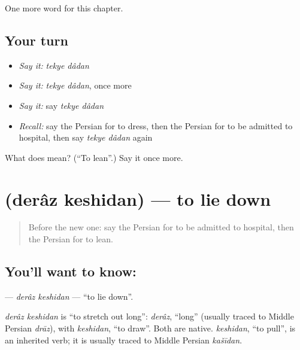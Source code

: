\begin{grammarlens}[title={What you've built}]
One more word for this chapter.
\end{grammarlens}

\subsection*{Your turn}
\begin{itemize}
\raggedright
  \item \emph{Say it:} \emph{tekye dâdan}
  \item \emph{Say it:} \emph{tekye dâdan}, once more
  \item \emph{Say it:} say \emph{tekye dâdan}
  \item \emph{Recall:} say the Persian for to dress, then the Persian for to be admitted to hospital, then say \emph{tekye dâdan} again
\end{itemize}

\begin{tcolorbox}[breakable,colback=teal!4,colframe=teal!35!black,title={Before you move on}]
What does   mean? (\textquotedblleft{}To lean\textquotedblright{}.) Say it once more.
\end{tcolorbox}
\section[\texorpdfstring{\fa{دراز} \fa{کشیدن} (derâz keshidan)}{دراز کشیدن (derâz keshidan)}]{  (derâz keshidan) — to lie down}

\label{lesson:FA-C261-deraz-keshidan}



\begin{quote}
Before the new one: say the Persian for to be admitted to hospital, then the Persian for to lean.
\end{quote}

\subsection*{You'll want to know:  }
\textbf{ } — \emph{derâz keshidan} — \textquotedblleft{}to lie down\textquotedblright{}.

\begin{cousinweb}
\emph{derâz keshidan} is \textquotedblleft{}to stretch out long\textquotedblright{}: \emph{derâz}, \textquotedblleft{}long\textquotedblright{} (usually traced to Middle Persian \emph{drāz}), with \emph{keshidan}, \textquotedblleft{}to draw\textquotedblright{}. Both are native. \emph{keshidan}, \textquotedblleft{}to pull\textquotedblright{}, is an inherited verb; it is usually traced to Middle Persian \emph{kašīdan}.
\end{cousinweb}

